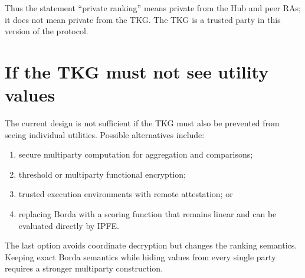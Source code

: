 \documentclass[11pt,a4paper]{article}
\begin{document}
Thus the statement ``private ranking'' means private from the Hub and peer RAs;
it does not mean private from the TKG. The TKG is a trusted party in this
version of the protocol.

\section{If the TKG must not see utility values}

The current design is not sufficient if the TKG must also be prevented from
seeing individual utilities. Possible alternatives include:

\begin{enumerate}
  \item secure multiparty computation for aggregation and comparisons;
  \item threshold or multiparty functional encryption;
  \item trusted execution environments with remote attestation; or
  \item replacing Borda with a scoring function that remains linear and can be
        evaluated directly by IPFE.
\end{enumerate}

The last option avoids coordinate decryption but changes the ranking semantics.
Keeping exact Borda semantics while hiding values from every single party
requires a stronger multiparty construction.
\end{document}
